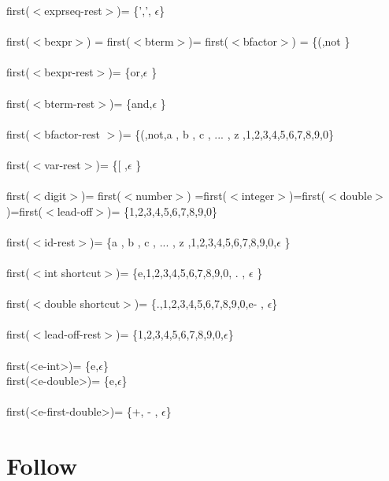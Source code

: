 \documentclass[fleqn]{article}
\begin{document}
first($<$exprseq-rest$>$)= \{',', $\epsilon$\}\\
\\
first($<$bexpr$>$) = first($<$bterm$>$)= first($<$bfactor$>$) = \{(,not \}\\
\\
first($<$bexpr-rest$>$)= \{or,$\epsilon$ \}\\
\\
first($<$bterm-rest$>$)= \{and,$\epsilon$ \}\\
\\
first($<$bfactor-rest $>$)= \{(,not,a , b , c , ... , z ,1,2,3,4,5,6,7,8,9,0\}\\
\\
first($<$var-rest$>$)= \{[ ,$\epsilon$ \}\\
\\
first($<$digit$>$)= first($<$number$>$) =first($<$integer$>$)=first($<$double$>$)=first($<$lead-off$>$)=  \{1,2,3,4,5,6,7,8,9,0\}\\
\\
first($<$id-rest$>$)= \{a , b , c , ... , z ,1,2,3,4,5,6,7,8,9,0,$\epsilon$ \}\\
\\
first($<$int shortcut$>$)= \{e,1,2,3,4,5,6,7,8,9,0, . , $\epsilon$ \}\\
\\
first($<$double shortcut$>$)= \{.,1,2,3,4,5,6,7,8,9,0,e- , $\epsilon$\}\\
\\
first($<$lead-off-rest$>$)= \{1,2,3,4,5,6,7,8,9,0,$\epsilon$\}\\
\\
first(<e-int>)= \{e,$\epsilon$\}\\
first(<e-double>)= \{e,$\epsilon$\}\\
\\
first(<e-first-double>)= \{+, - , $\epsilon$\}\\ 
\section{Follow}
\end{document}
